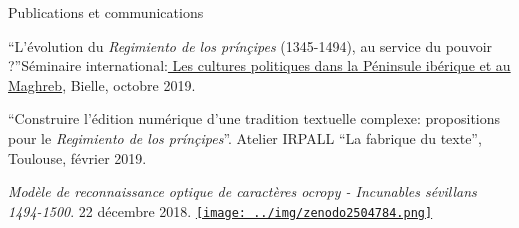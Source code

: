 











\begin{rubric}{Publications et communications}
                    
                
                    
                    \entry*
                \enquote{L'évolution du \textit{Regimiento de los prínçipes}
                    (1345-1494), au service du pouvoir ?}Séminaire international:\href{https://recherche.univ-pau.fr/fr/accueil/cpim.html}{ Les cultures
                    politiques dans la Péninsule ibérique et au Maghreb}, Bielle,
                    octobre 2019. 
                    
                    \entry*
                \enquote{Construire l'édition numérique d'une tradition textuelle complexe:
                    propositions pour le \textit{Regimiento de los prínçipes}}. Atelier
                    IRPALL \enquote{La fabrique du texte}, Toulouse, février
                    2019.
            
                    
                    \entry*
                \textit{Modèle de reconnaissance optique de caractères ocropy
                    - Incunables sévillans
                    1494-1500}.
                    22 décembre 2018. \href{https://doi.org/10.5281/zenodo.2504783}{\texttt{[image: ../img/zenodo2504784.png]}} \end{rubric}


